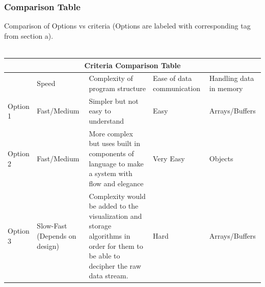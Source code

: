\documentclass[10pt,draftclsnofoot,onecolumn,retainorgcmds]{IEEEtran}
\begin{document}
\subsubsection{Comparison Table}
Comparison of Options vs criteria (Options are labeled with corresponding tag from section a). \\ \\
\begin{table}
\centering
\begin{tabular}{ |p{2cm}|p{2cm}|p{2cm}| p{2cm}|p{2cm}|  }
	\hline
	\multicolumn{5}{|c|}{Criteria Comparison Table} \\
	\hline
	&Speed&Complexity of program structure&Ease of data communication&Handling data in memory\\
	\hline
	Option 1&Fast/Medium&Simpler but not easy to understand&Easy&Arrays/Buffers\\
	\hline
	Option 2&Fast/Medium&More complex but uses built in components of language to make a system with flow and elegance&Very Easy&Objects\\
	\hline
	Option 3&Slow-Fast (Depends on design) &Complexity would be added to the visualization and storage algorithms in order for them to be able to decipher the raw data stream.&Hard&Arrays/Buffers \\
	\hline
\end{tabular}
\end{table}
\vspace{1cm}
\end{document}
